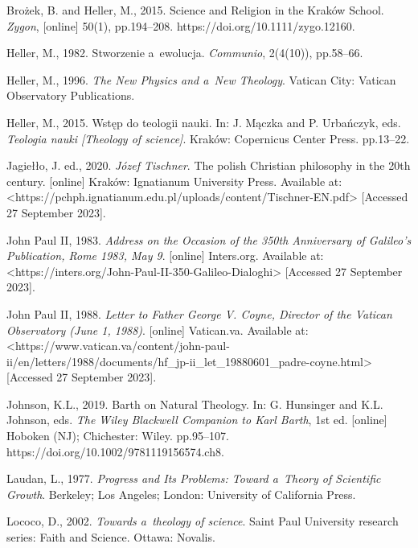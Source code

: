 Brożek, B. and Heller, M., 2015. Science and Religion in the Kraków School. \textit{Zygon}, [online] 50(1), pp.194–208. https://doi.org/10.1111/zygo.12160.



Heller, M., 1982. Stworzenie a~ewolucja. \textit{Communio}, 2(4(10)), pp.58–66.



Heller, M., 1996. \textit{The New Physics and a~New Theology}. Vatican City: Vatican Observatory Publications.



Heller, M., 2015. Wstęp do teologii nauki. In: J. Mączka and P. Urbańczyk, eds. \textit{Teologia nauki [Theology of science]}. Kraków: Copernicus Center Press. pp.13–22.



Jagiełło, J. ed., 2020. \textit{Józef Tischner}. The polish Christian philosophy in the 20th century. [online] Kraków: Ignatianum University Press. Available at: {\textless}https://pchph.ignatianum.edu.pl/uploads/content/Tischner-EN.pdf{\textgreater} [Accessed 27 September 2023].



John Paul II, 1983. \textit{Address on the Occasion of the 350th Anniversary of Galileo's Publication, Rome 1983, May 9}. [online] Inters.org. Available at: {\textless}https://inters.org/John-Paul-II-350-Galileo-Dialoghi{\textgreater} [Accessed 27 September 2023].



John Paul II, 1988. \textit{Letter to Father George V. Coyne, Director of the Vatican Observatory (June 1, 1988)}. [online] Vatican.va. Available at: {\textless}https://www.vatican.va/content/john-paul-ii/en/letters/1988/documents/hf\_jp-ii\_let\_19880601\_padre-coyne.html{\textgreater} [Accessed 27 September 2023].



Johnson, K.L., 2019. Barth on Natural Theology. In: G. Hunsinger and K.L. Johnson, eds. \textit{The Wiley Blackwell Companion to Karl Barth}, 1st ed. [online] Hoboken (NJ); Chichester: Wiley. pp.95–107. https://doi.org/10.1002/9781119156574.ch8.



Laudan, L., 1977. \textit{Progress and Its Problems: Toward a~Theory of Scientific Growth}. Berkeley; Los Angeles; London: University of California Press.



Lococo, D., 2002. \textit{Towards a~theology of science}. Saint Paul University research series: Faith and Science. Ottawa: Novalis.



